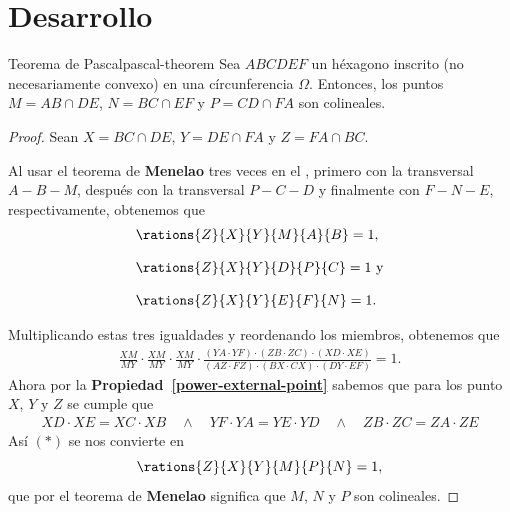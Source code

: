 \section{Desarrollo}



\begin{section-theorem.tcb}{Teorema de Pascal}{pascal-theorem}
    Sea $ABCDEF$ un héxagono inscrito (no necesariamente convexo) en una círcunferencia $\Omega$.
    Entonces, los puntos $M = AB \cap DE$, $N = BC \cap EF$ y $P = CD \cap FA$ son colineales.
\end{section-theorem.tcb}

\begin{proof}
    Sean $X = BC \cap DE$, $Y = DE \cap FA$ y $Z = FA \cap BC$.

    \begin{multicols}{2}
        \begin{figure}[H]
            \centering
            
        \end{figure}
        Al usar el teorema de \textbf{Menelao} tres veces en el , primero con la transversal $A - B - M$, después con la transversal $P - C - D$ y finalmente con $F - N - E$, respectivamente, obtenemos que
        \begin{align*}
            &\rations{Z}{X}{Y}{M}{A}{B} = 1,\\[3mm]
            &\rations{Z}{X}{Y}{D}{P}{C} = 1\ \text{y}\\[3mm]
            &\rations{Z}{X}{Y}{E}{F}{N} = 1.
        \end{align*}
    \end{multicols}
    \vspace{-10mm}
    Multiplicando estas tres igualdades y reordenando los miembros, obtenemos que
    \begin{align*}
        \frac{XM}{MY} \cdot \frac{XM}{MY} \cdot \frac{XM}{MY} \cdot \frac{(YA\cdot YF) \cdot (ZB\cdot ZC) \cdot (XD\cdot XE)}{(AZ\cdot FZ) \cdot (BX \cdot CX) \cdot (DY\cdot EF)} = 1. \tag{$\ast$}
    \end{align*}
    Ahora por la \textbf{Propiedad~\ref{power-external-point}} sabemos que para los punto $X$, $Y$ y $Z$ se cumple que
    \begin{align*}
        XD \cdot XE = XC \cdot XB \quad \land \quad
        YF \cdot YA = YE \cdot YD \quad \land \quad
        ZB \cdot ZC = ZA \cdot ZE
    \end{align*}
    Así $(\ast)$ se nos convierte en
    \[
        \rations{Z}{X}{Y}{M}{P}{N} = 1,
    \]
    que por el teorema de \textbf{Menelao} significa que $M$, $N$ y $P$ son colineales.
\end{proof}

